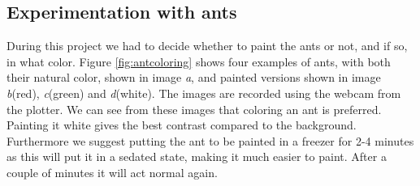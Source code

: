
\subsection{Experimentation with ants}
\label{ants}

During this project we had to decide whether to paint the ants or not, and if so, in what color. Figure \ref{fig:antcoloring} shows four examples of ants, with both their natural color, shown in image \emph{a}, and painted versions shown in image \emph{b}(red), \emph{c}(green) and \emph{d}(white). The images are recorded using the webcam from the plotter. We can see from these images that coloring an ant is preferred. Painting it white gives the best contrast compared to the background. Furthermore we suggest putting the ant to be painted in a freezer for 2-4 minutes as this will put it in a sedated state, making it much easier to paint. After a couple of minutes it will act normal again.\\

